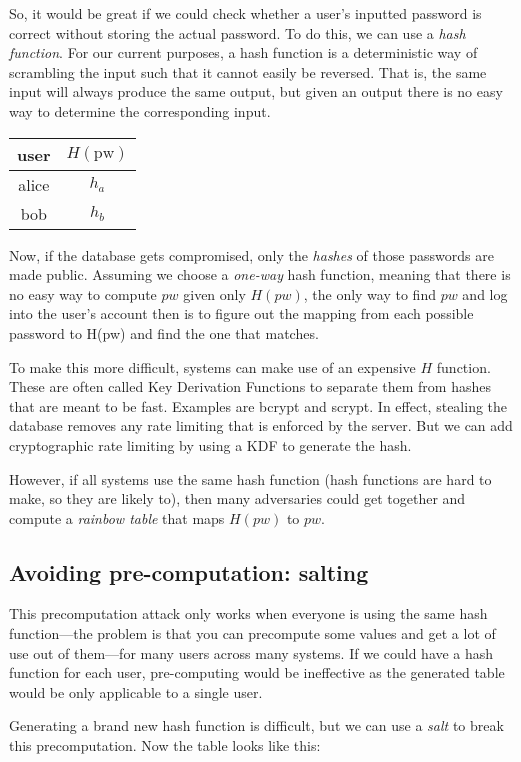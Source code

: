 So, it would be great if we could check whether a user's inputted password is correct without storing the actual password. To do this, we can use a \textit{hash function}. For our current purposes, a hash function is a deterministic way of scrambling the input such that it cannot easily be reversed. That is, the same input will always produce the same output, but given an output there is no easy way to determine the corresponding input.

\begin{tabular}{c|c}
  user & $H(\text{pw})$ \\
	\hline
	alice & $h_a$ \\
	bob & $h_b$ \\
\end{tabular}

Now, if the database gets compromised, only the \textit{hashes} of those passwords are made public. Assuming we choose a \textit{one-way} hash function, meaning that there is no easy way to compute $pw$ given only $H(pw)$, the only way to find $pw$ and log into the user's account then is to figure out the mapping from each possible password to H(pw) and find the one that matches. 

To make this more difficult, systems can make use of an expensive $H$ function. These are often called Key Derivation Functions to separate them from hashes that are meant to be fast. Examples are bcrypt and scrypt. In effect, stealing the database removes any rate limiting that is enforced by the server. But we can add cryptographic rate limiting by using a KDF to generate the hash.

However, if all systems use the same hash function (hash functions are hard to make, so they are likely to), then many adversaries could get together and compute a \textit{rainbow table} that maps $H(pw)$ to $pw$. 

\subsection{Avoiding pre-computation: salting}
This precomputation attack only works when everyone is using the same hash function---the problem is that you can precompute some values and get a lot of use out of them---for many users across many systems. If we could have a hash function for each user, pre-computing would be ineffective as the generated table would be only applicable to a single user.

Generating a brand new hash function is difficult, but we can use a \textit{salt} to break this precomputation. Now the table looks like this:

